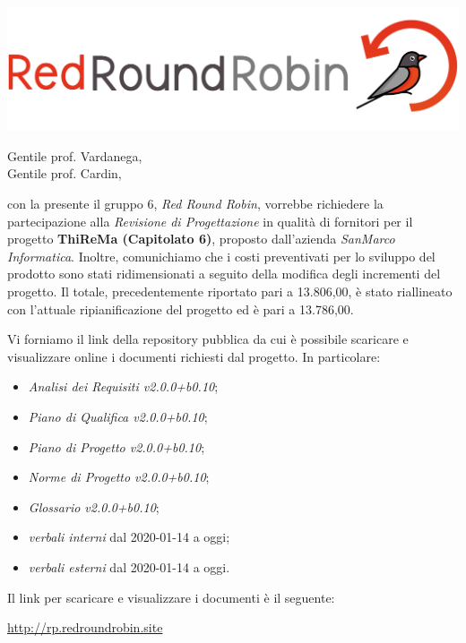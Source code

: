 \documentclass[12pt]{letter}
\date{09 marzo 2020}
\begin{document}
\begin{letter}{ }

\includegraphics[scale=0.17]{images/logo.png}

\opening{Gentile prof. Vardanega,\\ Gentile prof. Cardin, }

con la presente il gruppo 6, \textit{Red Round Robin}, vorrebbe richiedere la partecipazione alla \textit{Revisione di Progettazione} in qualità di fornitori per il progetto \textbf{ThiReMa (Capitolato 6)}, proposto dall'azienda \textit{SanMarco Informatica}.
\newline
Inoltre, comunichiamo che i costi preventivati per lo sviluppo del prodotto sono stati ridimensionati a seguito della modifica degli incrementi del progetto. Il totale, precedentemente riportato pari a \EUR{}13.806,00, è stato riallineato con l'attuale ripianificazione del progetto ed è pari a \EUR{}13.786,00.

Vi forniamo il link della repository pubblica da cui è possibile scaricare e visualizzare online i documenti richiesti dal progetto.
In particolare:

\begin{itemize}
	\item \textit{Analisi dei Requisiti v2.0.0+b0.10};
	\item \textit{Piano di Qualifica v2.0.0+b0.10};
	\item \textit{Piano di Progetto v2.0.0+b0.10};
	\item \textit{Norme di Progetto v2.0.0+b0.10};
	\item \textit{Glossario v2.0.0+b0.10};
	\item \textit{verbali interni} dal 2020-01-14 a oggi;
	\item \textit{verbali esterni} dal 2020-01-14 a oggi.
\end{itemize}

\newpage

Il link per scaricare e visualizzare i documenti è il seguente:

\begin{center}
	\href{https://drive.google.com/open?id=1z_jr9JuH_Iq8XucOWsljbxFb59HqZOnK}{http://rp.redroundrobin.site}
\end{center}



\end{letter}
\end{document}
